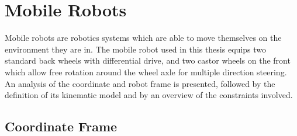 \section{Mobile Robots}

\noindent Mobile robots are robotics systems which are able to move themselves on the environment they are in. 
The mobile robot used in this thesis equips two standard back wheels with differential drive, and two castor wheels on the front which allow free rotation around the wheel axle for multiple direction steering. 
An analysis of the coordinate and robot frame is presented, followed by the definition of its kinematic model and by an overview of the constraints involved.

\subsection{Coordinate Frame}

